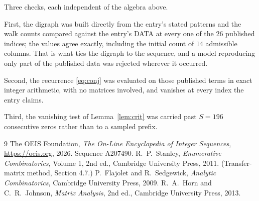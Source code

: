 \documentclass[11pt,a4paper]{article}
\theoremstyle{plain}
\theoremstyle{definition}
\begin{document}
Three checks, each independent of the algebra above.

First, the digraph was built directly from the entry's stated patterns and the walk counts
compared against the entry's DATA at every one of the $26$ published indices; the
values agree exactly, including the initial count of $14$ admissible columns. That is
what ties the digraph to the sequence, and a model reproducing only part of the published
data was rejected wherever it occurred.

Second, the recurrence \eqref{eq:conj} was evaluated on those published terms in exact
integer arithmetic, with no matrices involved, and vanishes at every index the entry claims.

Third, the vanishing test of Lemma~\ref{lem:crit} was carried past $S=196$ consecutive
zeros rather than to a sampled prefix.

\begin{thebibliography}{9}
 The OEIS Foundation, \emph{The On-Line Encyclopedia of Integer
Sequences}, \url{https://oeis.org}, 2026. Sequence A207490.
 R.~P.~Stanley, \emph{Enumerative Combinatorics}, Volume 1, 2nd ed.,
Cambridge University Press, 2011. (Transfer-matrix method, Section 4.7.)
 P.~Flajolet and R.~Sedgewick, \emph{Analytic Combinatorics}, Cambridge
University Press, 2009.
 R.~A.~Horn and C.~R.~Johnson, \emph{Matrix Analysis}, 2nd ed., Cambridge
University Press, 2013.
\end{thebibliography}
\end{document}
